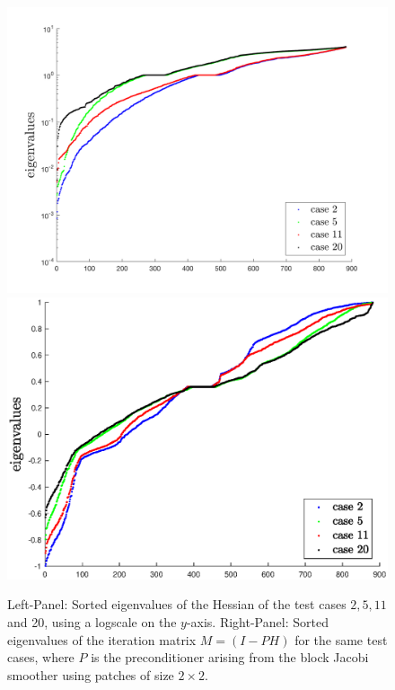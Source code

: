 \documentclass[../draft_1.tex]{subfiles}
\begin{document}
\begin{figure}
	\includegraphics[scale=0.4]{images/implementation/eigenvalues/some_eigenvalues_logy}
	\includegraphics[scale=0.4]{images/implementation/eigenvalues/plot_eigenvalues_iter_mat_block_Jac_tc}
	\caption{Left-Panel: Sorted eigenvalues of the Hessian of the test cases $2,5,11$ and 20, using a logscale on the $y$-axis. Right-Panel: Sorted eigenvalues of the iteration matrix $M = (I - PH)$ for the same test cases, where $P$ is the preconditioner arising from the block Jacobi smoother using patches of size $2 \times 2$.}
	\label{fig:eigenvalues_H_and_it_mat}
\end{figure}
\end{document}
